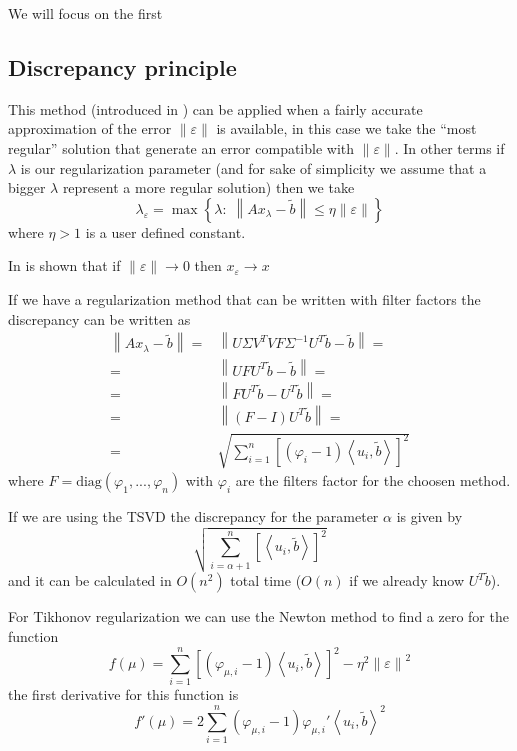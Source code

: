 \documentclass[a4paper,10pt]{article}
\theoremstyle{plain}
\theoremstyle{definition}
\theoremstyle{remark}
\newcommand{\set}[1]{\left\{#1\right\}}
\newcommand{\pa}[1]{\left(#1\right)}
\newcommand{\ang}[1]{\left<#1\right>}
\newcommand{\bra}[1]{\left[#1\right]}
\newcommand{\norm}[1]{\left\|#1\right\|}
\begin{document}
We will focus on the first

\subsection{Discrepancy principle}

This method (introduced in \cite{discreporig}) can be applied when a
fairly accurate approximation of the error $\norm{\varepsilon}$ is
available, in this case we take the ``most regular'' solution that
generate an error compatible with $\norm{\varepsilon}$. In other terms
if $\lambda$ is our regularization parameter (and for sake of
simplicity we assume that a bigger $\lambda$ represent a more regular
solution) then we take
\begin{equation}
  \label{eq:discrepancygen}
  \lambda _\varepsilon = \max \set { \lambda :\; \norm{ Ax_\lambda -
      \tilde b} \le \eta \norm{\varepsilon}} 
\end{equation}
where $\eta > 1$ is a user defined constant.

In \cite{discrepbook} is shown that if $\norm{\varepsilon} \to 0$ then
$x _\varepsilon \to x$

If we have a regularization method that can be written with filter
factors the discrepancy can be written as
\begin{align*}
  \norm{ Ax_\lambda - \tilde b } =& \norm{ U \Sigma V^T V F \Sigma
    ^{-1} U^T \tilde b - \tilde b} =\\
  =& \norm { U F U^T \tilde b - \tilde b} =\\
  = & \norm{ F U^T \tilde b - U^T \tilde b } =\\
  =& \norm{ \pa{F-I} U^T \tilde b} =\\
  =& \sqrt{\sum _{i=1} ^n \bra{ \pa{ \varphi _i -1} \ang{ u_i, \tilde b} } ^2}
\end{align*}
where $F = \mathrm{diag}\pa{ \varphi _1 ,... , \varphi _n}$ with
$\varphi _i$ are the filters factor for the choosen method.

If we are using the TSVD the discrepancy for the parameter $\alpha$ is
given by
\[ \sqrt{\sum _{i=\alpha +1} ^n \bra{ \ang{ u_i, \tilde b} } ^2 } \]
and it can be calculated in $O(n^2)$ total time ($O(n)$ if we already
know $U^T \tilde b$).

For Tikhonov regularization we can use the Newton method to find a
zero for the function
\[ f(\mu) = \sum _{i=1} ^n \bra{ \pa{ \varphi _{\mu,i} -1} \ang{ u_i,
    \tilde b} } ^2 - \eta ^2 \norm{\varepsilon} ^2 \] 
the first derivative for this function is
\[ f'(\mu) = 2 \sum _{i=1} ^n \pa{ \varphi _{\mu,i} -1} \varphi
_{\mu,i} ' \ang{ u_i, \tilde b} ^2 \]



\newpage


\end{document}
